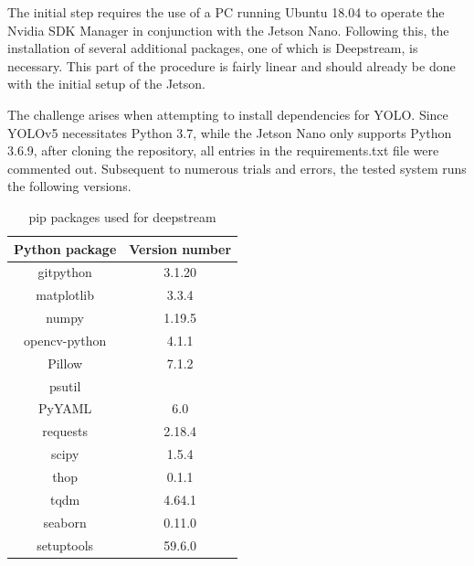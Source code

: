 The initial step requires the use of a PC running Ubuntu 18.04 to operate the Nvidia SDK Manager in conjunction with the Jetson Nano. Following this, the installation of several additional packages, one of which is Deepstream, is necessary. This part of the procedure is fairly linear and should already be done with the initial setup of the Jetson.

The challenge arises when attempting to install dependencies for YOLO. Since YOLOv5 necessitates Python 3.7, while the Jetson Nano only supports Python 3.6.9, after cloning the repository, all entries in the requirements.txt file were commented out. Subsequent to numerous trials and errors, the tested system runs the following versions.

\begin{table}[H]
\centering
\begin{tabular}
{ |c|c| } 
\hline
Python package & Version number \\
\hline
gitpython & 3.1.20\\
\hline
matplotlib & 3.3.4 \\
\hline
numpy & 1.19.5 \\
\hline
opencv-python & 4.1.1\\
\hline
Pillow & 7.1.2\\
\hline
psutil & \\
\hline
PyYAML & 6.0\\
\hline
requests & 2.18.4\\
\hline
scipy & 1.5.4\\
\hline
thop & 0.1.1\\
\hline
tqdm & 4.64.1\\
\hline
seaborn & 0.11.0\\
\hline
setuptools & 59.6.0\\
\hline
\end{tabular}
\caption{pip packages used for deepstream}
\label{tab:yolo_requirements}
\end{table}


